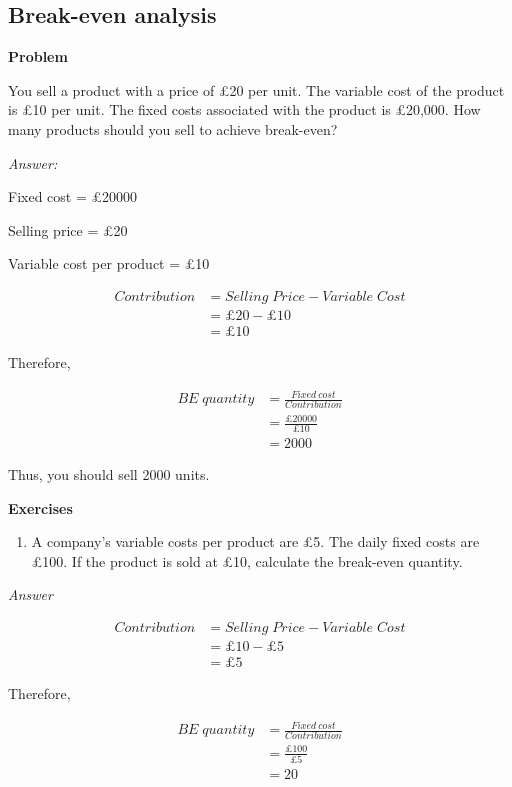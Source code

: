 \documentclass[
  letterpaper,
  DIV=11,
  numbers=noendperiod]{scrartcl}
\providecommand{\tightlist}{%
  \setlength{\itemsep}{0pt}\setlength{\parskip}{0pt}}\usepackage{longtable,booktabs,array}
\begin{document}
\hypertarget{break-even-analysis}{%
\subsection*{Break-even analysis}\label{break-even-analysis}}

\textbf{Problem}

You sell a product with a price of £20 per unit. The variable cost of
the product is £10 per unit. The fixed costs associated with the product
is £20,000. How many products should you sell to achieve break-even?

\emph{Answer:}

Fixed cost = £20000

Selling price = £20

Variable cost per product = £10

\begin{align}
Contribution &= Selling \; Price - Variable \; Cost \\
&= £20 - £10 \\
&= £10
\end{align}

Therefore,

\begin{align}
BE \; quantity &= \frac{Fixed \ cost}{Contribution} \\
&= \frac{£20000}{£10} \\
&= 2000
\end{align}

Thus, you should sell 2000 units.

\textbf{Exercises}

\begin{enumerate}
\def\labelenumi{\arabic{enumi}.}
\tightlist
\item
  A company's variable costs per product are £5. The daily fixed costs
  are £100. If the product is sold at £10, calculate the break-even
  quantity.
\end{enumerate}

\emph{Answer}

\begin{align}
Contribution &= Selling \; Price - Variable \; Cost \\
&= £10 - £5 \\
&= £5
\end{align}

Therefore,

\begin{align}
BE \; quantity &= \frac{Fixed \ cost}{Contribution} \\
&= \frac{£100}{£5} \\
&= 20
\end{align}
\end{document}

